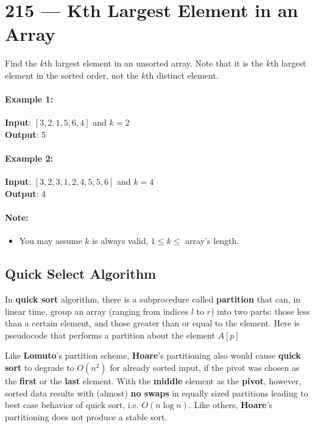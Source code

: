\section{215 --- Kth Largest Element in an Array}
Find the $k$th largest element in an unsorted array. Note that it is the $k$th largest element in the sorted order, not the $k$th distinct element.
\paragraph{Example 1:}
\begin{flushleft}
\textbf{Input}: $[3,2,1,5,6,4]$ and $k = 2$
\\
\textbf{Output}: 5
\end{flushleft}
\paragraph{Example 2:}
\begin{flushleft}
\textbf{Input}: $[3,2,3,1,2,4,5,5,6]$ and $k = 4$
\\
\textbf{Output}: 4
\end{flushleft}
\paragraph{Note:} 
\begin{itemize}
\item You may assume $k$ is always valid, $1 \leq k \leq $ array's length.
\end{itemize}
\subsection{Quick Select Algorithm}
In \textbf{quick sort} algorithm, there is a subprocedure called \textbf{partition} that can, in linear time, group an array (ranging from indices $l$ to $r$) into two parts: those less than a certain element, and those greater than or equal to the element. Here is pseudocode that performs a partition about the element $A[p]$

Like \textbf{Lomuto}'s partition scheme, \textbf{Hoare}'s partitioning also would cause \textbf{quick sort} to degrade to $O(n^2)$ for already sorted input, if the pivot was chosen as the \textbf{first} or the \textbf{last} element. With the \textbf{middle} element as the \textbf{pivot}, however, sorted data results with (almost) \textbf{no swaps} in equally sized partitions leading to best case behavior of quick sort, i.e. $O(n \log n)$. Like others, \textbf{Hoare}'s partitioning does not produce a stable sort.

